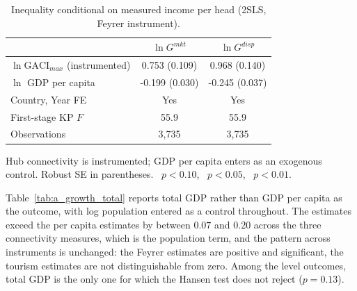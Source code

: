 \begin{table}[H]\centering\caption{Inequality conditional on measured income per head (2SLS, Feyrer instrument).}\label{tab:a_growth_cond}
\begin{threeparttable}\small\begin{tabular}{lcc}
\toprule
 & $\ln G^{mkt}$ & $\ln G^{disp}$ \\
\midrule
$\ln\mathrm{GACI}_{max}$ (instrumented) & 0.753\sym{***} (0.109) & 0.968\sym{***} (0.140) \\
$\ln$ GDP per capita & -0.199\sym{***} (0.030) & -0.245\sym{***} (0.037) \\
\midrule
Country, Year FE & Yes & Yes \\
First-stage KP $F$ & 55.9 & 55.9 \\
Observations & 3,735 & 3,735 \\
\bottomrule
\end{tabular}
\begin{tablenotes}\footnotesize\item Hub connectivity is instrumented; GDP per capita enters as an exogenous control. Robust SE in parentheses. \sym{*}~$p<0.10$, \sym{**}~$p<0.05$, \sym{***}~$p<0.01$.\end{tablenotes}\end{threeparttable}\end{table}

Table~\ref{tab:a_growth_total} reports total GDP rather than GDP per capita as the outcome, with log population entered as a control throughout. The estimates exceed the per capita estimates by between $0.07$ and $0.20$ across the three connectivity measures, which is the population term, and the pattern across instruments is unchanged: the Feyrer estimates are positive and significant, the tourism estimates are not distinguishable from zero. Among the level outcomes, total GDP is the only one for which the Hansen test does not reject ($p=0.13$).

